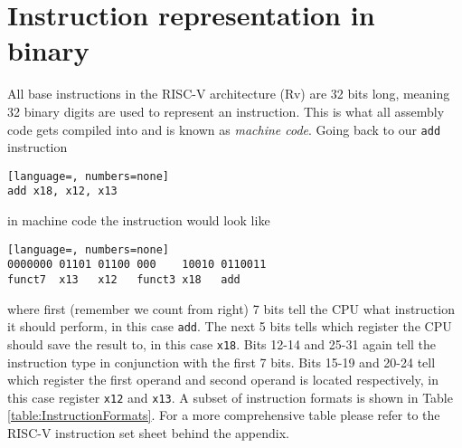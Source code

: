 \section{Instruction representation in binary}\label{section:InstructionRep}
    All base instructions in the RISC-V architecture (Rv) are 32 bits long, meaning 32 binary digits are used to represent an instruction. This is what all assembly code gets compiled into and is known as \textit{machine code}.
    Going back to our \texttt{add} instruction 
    \begin{lstlisting}[language=, numbers=none]
add x18, x12, x13
    \end{lstlisting}
    in machine code the instruction would look like
    \begin{lstlisting}[language=, numbers=none]
0000000 01101 01100 000    10010 0110011
funct7  x13   x12   funct3 x18   add
    \end{lstlisting}
    where first (remember we count from right) 7 bits tell the CPU what instruction it should perform, in this case \texttt{add}. The next 5 bits tells which register the CPU should save the result to, in this case \texttt{x18}. Bits 12-14 and 25-31 again tell the instruction type in conjunction with the first 7 bits. Bits 15-19 and 20-24 tell which register the first operand and second operand is located respectively, in this case register \texttt{x12} and \texttt{x13}. A subset of instruction formats is shown in Table \ref{table:InstructionFormats}. For a more comprehensive table please refer to the RISC-V instruction set sheet behind the appendix.
    
